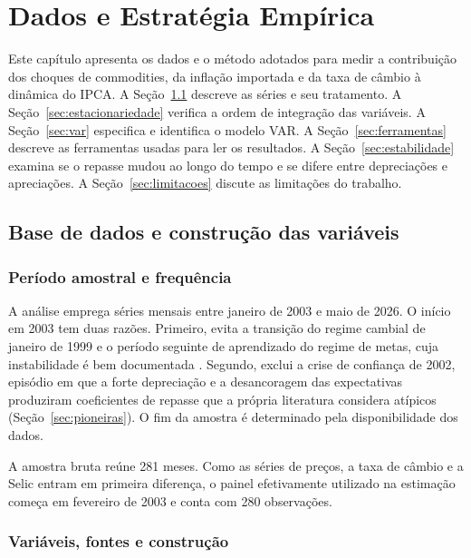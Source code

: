 \documentclass[12pt,openright,oneside,a4paper,portuguese,brazil]{abntex2}
\begin{document}
\chapter{Dados e Estratégia Empírica}
\label{cap:dados}

Este capítulo apresenta os dados e o método adotados para medir a contribuição
dos choques de commodities, da inflação importada e da taxa de câmbio à
dinâmica do IPCA. A Seção~\ref{sec:dados} descreve as séries e seu tratamento.
A Seção~\ref{sec:estacionariedade} verifica a ordem de integração das
variáveis. A Seção~\ref{sec:var} especifica e identifica o modelo VAR. A
Seção~\ref{sec:ferramentas} descreve as ferramentas usadas para ler os
resultados. A Seção~\ref{sec:estabilidade} examina se o repasse mudou ao longo
do tempo e se difere entre depreciações e apreciações. A
Seção~\ref{sec:limitacoes} discute as limitações do trabalho.

\section{Base de dados e construção das variáveis}
\label{sec:dados}

\subsection{Período amostral e frequência}

A análise emprega séries mensais entre janeiro de 2003 e maio de 2026. O início em 2003 tem duas razões. Primeiro, evita a transição do regime cambial de
janeiro de 1999 e o período seguinte de aprendizado do regime de metas, cuja
instabilidade é bem documentada \cite{minella2003}. Segundo, exclui a crise de
confiança de 2002, episódio em que a forte depreciação e a desancoragem das
expectativas produziram coeficientes de repasse que a própria literatura
considera atípicos (Seção~\ref{sec:pioneiras}). O fim da amostra é determinado
pela disponibilidade dos dados.

A amostra bruta reúne 281 meses. Como as séries de preços, a taxa de câmbio e a
Selic entram em primeira diferença, o painel efetivamente utilizado na
estimação começa em fevereiro de 2003 e conta com 280 observações.

\subsection{Variáveis, fontes e construção}
\label{sec:variaveis}
\end{document}
